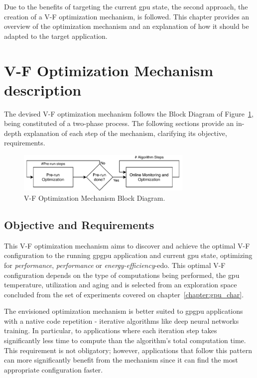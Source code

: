 Due to the benefits of targeting the current \acrshort{gpu} state, the second approach, the creation of a V-F optimization mechanism, is followed. This chapter provides an overview of the optimization mechanism and an explanation of how it should be adapted to the target application.





\section{V-F Optimization Mechanism description}
\label{section:opt}

The devised V-F optimization mechanism follows the Block Diagram of Figure~\ref{fig:opt_mech}, being constituted of a two-phase process. The following sections provide an in-depth explanation of each step of the mechanism, clarifying its objective, requirements.

\begin{figure}[htb]
  \centering
  \includegraphics[width=0.75\textwidth]{Figures/Optimization/full_mech.pdf}
  \caption{V-F Optimization Mechanism Block Diagram.}
  \label{fig:opt_mech}
\end{figure}

\subsection{Objective and Requirements}

This V-F optimization mechanism aims to discover and achieve the optimal V-F configuration to the running \acrshort{gpgpu} application and current \acrshort{gpu} state, optimizing for \textit{performance}, \textit{performance} or \textit{energy-efficiency}-\acrshort{edo}. This optimal V-F configuration depends on the type of computations being performed, the \acrshort{gpu} temperature, utilization and aging and is selected from an exploration space concluded from the set of experiments covered on chapter~\ref{chapter:gpu_char}. 

The envisioned optimization mechanism is better suited to \acrshort{gpgpu} applications with a native code repetition - iterative algorithms like deep neural networks training. In particular, to applications where each iteration step takes significantly less time to compute than the algorithm's total computation time. This requirement is not obligatory; however, applications that follow this pattern can more significantly benefit from the mechanism since it can find the most appropriate configuration faster.

